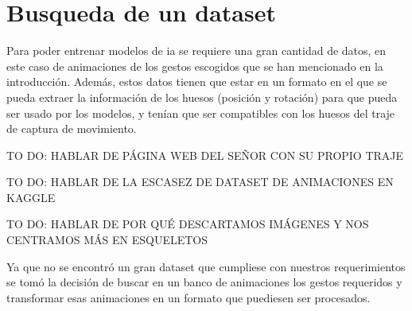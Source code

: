 \section{Busqueda de un dataset}
\label{sec:busquedaDataset}
Para poder entrenar modelos de \gls{ia} se requiere una gran cantidad de datos, en este caso de animaciones de los gestos escogidos que se han mencionado en la introducción. 
Además, estos datos tienen que estar en un formato en el que se pueda extraer la información de los huesos (posición y rotación) para que pueda ser usado por los modelos, y tenían que ser compatibles con los huesos del traje de captura de movimiento.

TO DO: HABLAR DE PÁGINA WEB DEL SEÑOR CON SU PROPIO TRAJE

TO DO: HABLAR DE LA ESCASEZ DE DATASET DE ANIMACIONES EN KAGGLE

TO DO: HABLAR DE POR QUÉ DESCARTAMOS IMÁGENES Y NOS CENTRAMOS MÁS EN ESQUELETOS

Ya que no se encontró un gran dataset que cumpliese con nuestros requerimientos se tomó la decisión de buscar en un banco de animaciones los gestos requeridos y transformar esas animaciones en un formato que puediesen ser procesados.